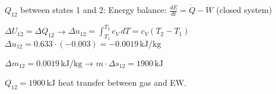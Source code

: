 \( Q_{12} \) between states 1 and 2:  
Energy balance:  
\( \frac{dE}{dt} = \dot{Q} - \dot{W} \) (closed system)  

\( \Delta U_{12} = \Delta Q_{12} \) → \( \Delta u_{12} = \int_{T_1}^{T_2} c_V \, dT = c_V (T_2 - T_1) \)  
\( \Delta u_{12} = 0.633 \cdot (-0.003) = -0.0019 \, \text{kJ/kg} \)  

\( \Delta m_{12} = 0.0019 \, \text{kJ/kg} \) → \( m \cdot \Delta s_{12} = 1900 \, \text{kJ} \)  

\( Q_{12} = 1900 \, \text{kJ} \) heat transfer between gas and EW.
